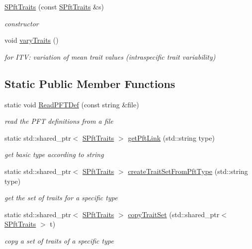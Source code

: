 \begin{DoxyCompactItemize}
\mbox{\label{class_s_pft_traits_add5e06f116e344c1a2bd0ab6181fc0da}} 
\mbox{\hyperlink{class_s_pft_traits_add5e06f116e344c1a2bd0ab6181fc0da}{S\+Pft\+Traits}} (const \mbox{\hyperlink{class_s_pft_traits}{S\+Pft\+Traits}} \&s)
\begin{DoxyCompactList}\small\item\em constructor \end{DoxyCompactList}\item 
\mbox{\label{class_s_pft_traits_aaaf6c9c81762e5b4e75822a56f6a76f5}} 
void \mbox{\hyperlink{class_s_pft_traits_aaaf6c9c81762e5b4e75822a56f6a76f5}{vary\+Traits}} ()
\begin{DoxyCompactList}\small\item\em for I\+TV\+: variation of mean trait values (intraspecific trait variability) \end{DoxyCompactList}\end{DoxyCompactItemize}
\subsection*{Static Public Member Functions}
\begin{DoxyCompactItemize}
\item 
static void \mbox{\hyperlink{class_s_pft_traits_ac79f86169db7e8dc48cd7d3ac8890a63}{Read\+P\+F\+T\+Def}} (const string \&file)
\begin{DoxyCompactList}\small\item\em read the P\+FT definitions from a file \end{DoxyCompactList}\item 
static std\+::shared\+\_\+ptr$<$ \mbox{\hyperlink{class_s_pft_traits}{S\+Pft\+Traits}} $>$ \mbox{\hyperlink{class_s_pft_traits_a45c12aa12c09c72da36d303a646fc645}{get\+Pft\+Link}} (std\+::string type)
\begin{DoxyCompactList}\small\item\em get basic type according to string \end{DoxyCompactList}\item 
static std\+::shared\+\_\+ptr$<$ \mbox{\hyperlink{class_s_pft_traits}{S\+Pft\+Traits}} $>$ \mbox{\hyperlink{class_s_pft_traits_ad5ae63e54ff232f592ef14d18f961368}{create\+Trait\+Set\+From\+Pft\+Type}} (std\+::string type)
\begin{DoxyCompactList}\small\item\em get the set of traits for a specific type \end{DoxyCompactList}\item 
static std\+::shared\+\_\+ptr$<$ \mbox{\hyperlink{class_s_pft_traits}{S\+Pft\+Traits}} $>$ \mbox{\hyperlink{class_s_pft_traits_a66a9a088f4d2d7779d6a1fdb1461c117}{copy\+Trait\+Set}} (std\+::shared\+\_\+ptr$<$ \mbox{\hyperlink{class_s_pft_traits}{S\+Pft\+Traits}} $>$ t)
\begin{DoxyCompactList}\small\item\em copy a set of traits of a specific type \end{DoxyCompactList}\end{DoxyCompactItemize}
